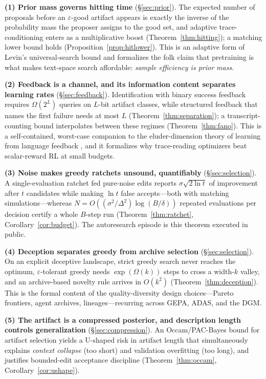 \documentclass{article}
\theoremstyle{plain}
\theoremstyle{definition}
\theoremstyle{remark}
\newcommand{\eps}{\varepsilon}
\begin{document}
\textbf{(1) Prior mass governs hitting time} (\S\ref{sec:prior}). The expected number of proposals before an $\eps$-good artifact appears is exactly the inverse of the probability mass the proposer assigns to the good set, and adaptive trace-conditioning enters as a multiplicative boost (Theorem~\ref{thm:hitting}); a matching lower bound holds (Proposition~\ref{prop:hitlower}). This is an adaptive form of Levin's universal-search bound \cite{levin1973universal} and formalizes the folk claim that pretraining is what makes text-space search affordable: \emph{sample efficiency is prior mass}.

\textbf{(2) Feedback is a channel, and its information content separates learning rates} (\S\ref{sec:feedback}). Identification with binary success feedback requires $\Omega(2^L)$ queries on $L$-bit artifact classes, while structured feedback that names the first failure needs at most $L$ (Theorem~\ref{thm:separation}); a transcript-counting bound interpolates between these regimes (Theorem~\ref{thm:fano}). This is a self-contained, worst-case companion to the eluder-dimension theory of learning from language feedback \cite{xu2025llf}, and it formalizes why trace-reading optimizers beat scalar-reward RL at small budgets.

\textbf{(3) Noise makes greedy ratchets unsound, quantifiably} (\S\ref{sec:selection}). A single-evaluation ratchet fed pure-noise edits reports $\sigma\sqrt{2\ln t}$ of improvement after $t$ candidates while making $\ln t$ false accepts---both with matching simulations---whereas $N = O((\sigma^2/\Delta^2)\log(B/\delta))$ repeated evaluations per decision certify a whole $B$-step run (Theorem~\ref{thm:ratchet}, Corollary~\ref{cor:budget}). The autoresearch episode is this theorem executed in public.

\textbf{(4) Deception separates greedy from archive selection} (\S\ref{sec:selection}). On an explicit deceptive landscape, strict greedy search never reaches the optimum, $\eps$-tolerant greedy needs $\exp(\Omega(k))$ steps to cross a width-$k$ valley, and an archive-based novelty rule arrives in $O(k^2)$ (Theorem~\ref{thm:deception}). This is the formal content of the quality-diversity design choices---Pareto frontiers, agent archives, lineages---recurring across GEPA, ADAS, and the DGM.

\textbf{(5) The artifact is a compressed posterior, and description length controls generalization} (\S\ref{sec:compression}). An Occam/PAC-Bayes bound for artifact selection yields a U-shaped risk in artifact length that simultaneously explains \emph{context collapse} (too short) and validation overfitting (too long), and justifies bounded-edit acceptance discipline (Theorem~\ref{thm:occam}, Corollary~\ref{cor:ushape}).
\end{document}
